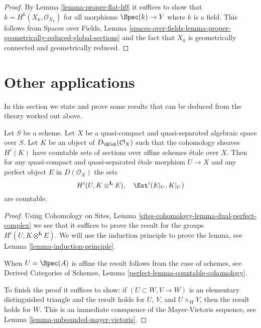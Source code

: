 \begin{proof}
By Lemma \ref{lemma-proper-flat-h0}
it suffices to show that $k = H^0(X_k, \mathcal{O}_{X_k})$
for all morphisms $\Spec(k) \to Y$ where $k$ is a field. This follows from
Spaces over Fields, Lemma
\ref{spaces-over-fields-lemma-proper-geometrically-reduced-global-sections}
and the fact that $X_k$ is geometrically connected and geometrically reduced.
\end{proof}








\section{Other applications}
\label{section-other-applications}

\noindent
In this section we state and prove some results that can be deduced
from the theory worked out above.

\begin{lemma}
\label{lemma-countable-cohomology}
Let $S$ be a scheme. Let $X$ be a quasi-compact and quasi-separated
algebraic space over $S$. Let $K$ be an object of $D_\QCoh(\mathcal{O}_X)$
such that the cohomology sheaves $H^i(K)$ have countable
sets of sections over affine schemes \'etale over $X$.
Then for any quasi-compact and quasi-separated \'etale morphism $U \to X$
and any perfect object $E$ in $D(\mathcal{O}_X)$
the sets
$$
H^i(U, K \otimes^\mathbf{L} E),\quad \Ext^i(E|_U, K|_U)
$$
are countable.
\end{lemma}

\begin{proof}
Using Cohomology on Sites, Lemma
\ref{sites-cohomology-lemma-dual-perfect-complex}
we see that it suffices to prove the result
for the groups $H^i(U, K \otimes^\mathbf{L} E)$.
We will use the induction principle to prove the lemma, see
Lemma \ref{lemma-induction-principle}.

\medskip\noindent
When $U = \Spec(A)$ is affine the result follows from
the case of schemes, see Derived Categories of Schemes,
Lemma \ref{perfect-lemma-countable-cohomology}.

\medskip\noindent
To finish the proof it suffices to show: if $(U \subset W, V \to W)$
is an elementary distinguished triangle
and the result holds for $U$, $V$, and $U \times_W V$, then
the result holds for $W$. This is an immediate consquence
of the Mayer-Vietoris sequence, see
Lemma \ref{lemma-unbounded-mayer-vietoris}.
\end{proof}

